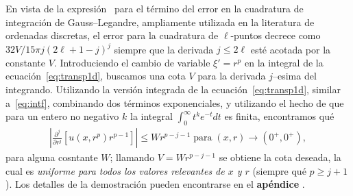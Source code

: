 En vista de la expresión~\cite[p. 77]{Trefethen2008} 
para el término del error en la cuadratura de integración 
de Gauss--Legandre, ampliamente utilizada en la literatura 
de ordenadas discretas, el error para la cuadratura de $\ell$-puntos 
decrece como $32V/15\pi j (2\ell+1-j)^j$ siempre que la derivada 
$j \leq 2\ell$ esté acotada por la constante $V$. 
Introduciendo el cambio de variable  $\xi'=r^p$ en la integral 
de la ecuación~\eqref{eq:transp1d}, buscamos una cota $V$ 
para la derivada $j$--esima del integrando. 
Utilizando la versión integrada de la ecuación~\eqref{eq:transp1d}, 
similar a~\eqref{eq:intf}, combinando dos términos exponenciales, 
y utilizando el hecho de que para un entero no negativo $k$ 
la integral $\int_0^\infty t^k e^{-t} dt$ es finita, 
encontramos qué
\begin{equation*}
\begin{split}
\left | \frac{\partial^j }{\partial r^j}\left[ u(x,r^p) r^{p-1}\right]
\right|\leq W r^{p-j-1}\; \text{para}  \; (x,r) \to (0^+,0^+),
\end{split}
\label{eq:boundedder}
\end{equation*}
para alguna cosntante $W$; llamando $V = W r^{p-j-1}$  
se obtiene la cota deseada, la cual es {\em uniforme 
para todos los valores relevantes de $x$ y $r$ } (siempre qué 
$p \ge j+1$). Los 
detalles de la demostración pueden encontrarse en el {\bf apéndice }.

